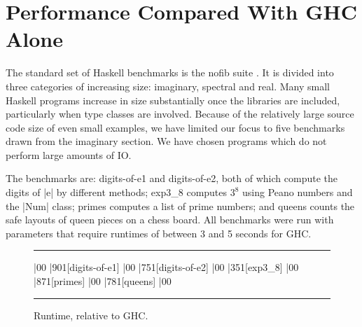 \documentclass{llncs}
\newenvironment{fig}
    {\begin{figure}[tbp]\hrule}
    {\end{figure}}
\newcommand{\figend}{\hrule}
\begin{document}
\section{Performance Compared With GHC Alone}
\label{sec:haskell_results}

The standard set of Haskell benchmarks is the nofib suite \cite{nofib}. It is divided into three categories of increasing size: imaginary, spectral and real. Many small Haskell programs increase in size substantially once the libraries are included, particularly when type classes are involved. Because of the relatively large source code size of even small examples, we have limited our focus to five benchmarks drawn from the imaginary section. We have chosen programs which do not perform large amounts of IO.

The benchmarks are: digits-of-e1 and digits-of-e2, both of which compute the digits of |e| by different methods; exp3\_8 computes $3^8$ using Peano numbers and the |Num| class; primes computes a list of prime numbers; and queens counts the safe layouts of queen pieces on a chess board. All benchmarks were run with parameters that require runtimes of between 3 and 5 seconds for GHC.

\begin{fig}
\vspace{7mm}
\begin{barenv}
 
\bar{0}{0}
\bar{90}{1}[digits-of-e1]
\bar{0}{0}
\bar{75}{1}[digits-of-e2]
\bar{0}{0}
\bar{35}{1}[exp3\_8]
\bar{0}{0}
\bar{87}{1}[primes]
\bar{0}{0}
\bar{78}{1}[queens]
\bar{0}{0}
\end{barenv}
\vspace{3mm}
\figend
\caption{Runtime, relative to GHC.}
\label{fig:haskell_results}
\end{fig}
\end{document}
